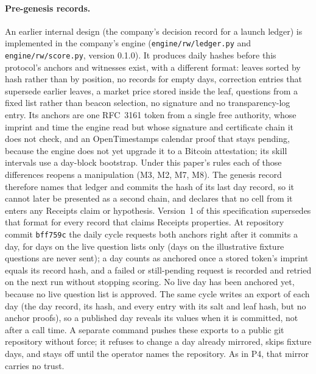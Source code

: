\documentclass[11pt]{article}
\begin{document}
\paragraph{Pre-genesis records.} An earlier internal design (the company's decision record for a launch ledger) is implemented in the company's engine (\nolinkurl{engine/rw/ledger.py} and \nolinkurl{engine/rw/score.py}, version 0.1.0). It produces daily hashes before this protocol's anchors and witnesses exist, with a different format: leaves sorted by hash rather than by position, no records for empty days, correction entries that supersede earlier leaves, a market price stored inside the leaf, questions from a fixed list rather than beacon selection, no signature and no transparency-log entry. Its anchors are one RFC~3161 token from a single free authority, whose imprint and time the engine read but whose signature and certificate chain it does not check, and an OpenTimestamps calendar proof that stays pending, because the engine does not yet upgrade it to a Bitcoin attestation; its skill intervals use a day-block bootstrap. Under this paper's rules each of those differences reopens a manipulation (M3, M2, M7, M8). The genesis record therefore names that ledger and commits the hash of its last day record, so it cannot later be presented as a second chain, and declares that no cell from it enters any Receipts claim or hypothesis. Version~1 of this specification supersedes that format for every record that claims Receipts properties. At repository commit \texttt{bff759c} the daily cycle requests both anchors right after it commits a day, for days on the live question lists only (days on the illustrative fixture questions are never sent); a day counts as anchored once a stored token's imprint equals its record hash, and a failed or still-pending request is recorded and retried on the next run without stopping scoring. No live day has been anchored yet, because no live question list is approved. The same cycle writes an export of each day (the day record, its hash, and every entry with its salt and leaf hash, but no anchor proofs), so a published day reveals its values when it is committed, not after a call time. A separate command pushes these exports to a public git repository without force; it refuses to change a day already mirrored, skips fixture days, and stays off until the operator names the repository. As in P4, that mirror carries no trust.
\end{document}
